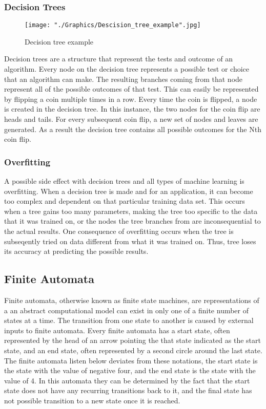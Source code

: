 \documentclass{sig-alternate}
\begin{document}
\subsubsection{Decision Trees}
\label{sec:decision_trees}
\begin{figure}[!]
	\texttt{[image: "./Graphics/Descision\_tree\_example".jpg]}
	\caption{Decision tree example}
	\label{fig:descisiontree}
\end{figure}
	Decision trees are a structure that represent the tests and outcome of an algorithm. Every node on the decision tree represents a possible test or choice that an algorithm can make. The resulting branches coming from that node represent all of the possible outcomes of that test. This can easily be represented by flipping a coin multiple times in a row. Every time the coin is flipped, a node is created in the decision tree. In this instance, the two nodes for the coin flip are heads and tails. For every subsequent coin flip, a new set of nodes and leaves are generated. As a result the decision tree contains all possible outcomes for the Nth coin flip.

\subsubsection{Overfitting}
\label{sec:overfitting}
	A possible side effect with decision trees and all types of machine learning is overfitting. When a decision tree is made and for an application, it can become too complex and dependent on that particular training data set. This occurs when a tree gains too many parameters, making the tree too specific to the data that it was trained on, or the nodes the tree branches from are inconsequential to the actual results. One consequence of overfitting occurs when the tree is subseqently tried on data different from what it was trained on. Thus, tree loses its accuracy at predicting the possible results.
\subsection{Finite Automata}
\label{sec:finiteautomata}
	Finite automata, otherwise known as finite state machines, are representations of a an abstract computational model can exist in only one of a finite number of states at a time. The transition from one state to another is caused by external inputs to finite automata. Every finite automata has a start state, often represented by the head of an arrow pointing the that state indicated as the start state, and an end state, often represented by a second circle around the last state. The finite automata listen below deviates from these notations, the start state is the state with the value of negative four, and the end state is the state with the value of 4. In this automata they can be determined by the fact that the start state does not have any recurring transitions back to it, and the final state has not possible transition to a new state once it is reached.
\end{document}
